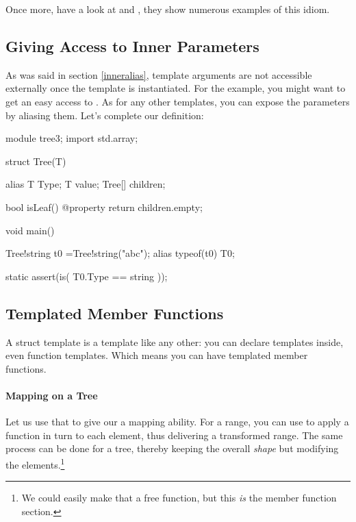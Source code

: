 Once more, have a look at  and , they show numerous examples of this idiom.

\subsection{Giving Access to Inner Parameters}\label{givingaccess}

As was said in section \ref{inneralias}, template arguments are not accessible externally once the template is instantiated. For the  example, you might want to get an easy access to . As for any other templates, you can expose the parameters by aliasing them. Let's complete our  definition:

\begin{dcode}
module tree3;
import std.array;

struct Tree(T)
{
    alias T Type;
    T value;
    Tree[] children;

    bool isLeaf() @property { return children.empty;}
}     

void main()
{
    Tree!string t0 =Tree!string("abc");
    alias typeof(t0) T0;

    static assert(is( T0.Type == string ));
}
\end{dcode}

\subsection{Templated Member Functions}\label{membertemplates}

A struct template is a template like any other: you can declare templates inside, even function templates. Which means you can have templated member functions. 


\paragraph{Mapping on a Tree} Let us use that to give our  a mapping ability. For a range, you can use  to apply a function in turn to each element, thus delivering a transformed range. The same process can be done for a tree, thereby keeping the overall \emph{shape} but modifying the elements.\footnote{ We could easily make that a free function, but this \emph{is} the member function section.}

